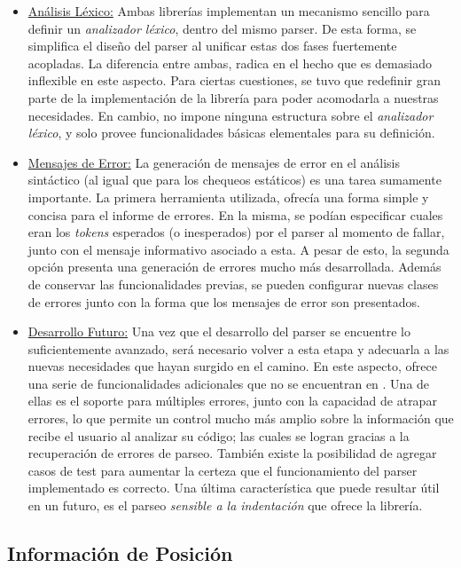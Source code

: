 \begin{itemize}
    \item \underline{Análisis Léxico:}
    Ambas librerías implementan un mecanismo sencillo para definir un \textit{analizador léxico}, dentro del mismo parser.
    De esta forma, se simplifica el diseño del parser al unificar estas dos fases fuertemente acopladas.
    La diferencia entre ambas, radica en el hecho que \Parsec{} es demasiado inflexible en este aspecto.
    Para ciertas cuestiones, se tuvo que redefinir gran parte de la implementación de la librería para poder acomodarla a nuestras necesidades.
    En cambio, \Megaparsec{} no impone ninguna estructura sobre el \textit{analizador léxico}, y solo provee funcionalidades básicas elementales para su definición.
    \item \underline{Mensajes de Error:}
    La generación de mensajes de error en el análisis sintáctico (al igual que para los chequeos estáticos) es una tarea sumamente importante.
    La primera herramienta utilizada, ofrecía una forma simple y concisa para el informe de errores.
    En la misma, se podían especificar cuales eran los \textit{tokens} esperados (o inesperados) por el parser al momento de fallar, junto con el mensaje informativo asociado a esta.
    A pesar de esto, la segunda opción presenta una generación de errores mucho más desarrollada.
    Además de conservar las funcionalidades previas, se pueden configurar nuevas clases de errores junto con la forma que los mensajes de error son presentados.
    \item \underline{Desarrollo Futuro:}
    Una vez que el desarrollo del parser se encuentre lo suficientemente avanzado, será necesario volver a esta etapa y adecuarla a las nuevas necesidades que hayan surgido en el camino.
    En este aspecto, \Megaparsec{} ofrece una serie de funcionalidades adicionales que no se encuentran en \Parsec{}.
    Una de ellas es el soporte para múltiples errores, junto con la capacidad de atrapar errores, lo que permite un control mucho más amplio sobre la información que recibe el usuario al analizar su código; las cuales se logran gracias a la recuperación de errores de parseo.
    También existe la posibilidad de agregar casos de test para aumentar la certeza que el funcionamiento del parser implementado es correcto.
    Una última característica que puede resultar útil en un futuro, es el parseo \textit{sensible a la indentación} que ofrece la librería.
\end{itemize}

\subsection{Información de Posición}

